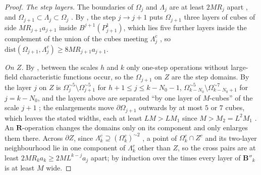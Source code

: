 \documentclass[11pt]{preprint}
\numberwithin{equation}{section}
\theoremstyle{definition}
\theoremstyle{remark}
\theoremstyle{plain}
\begin{document}
\begin{proof}
\emph{The step layers.} The boundaries of $\Omega_j$ and $\Lambda_j$ are at least $2MR_j$ apart \cite[p.~256, ll.~21--24]{BalabanCRE}, and $\Omega_{j+1} \subset \Lambda_j \subset \Omega_j$ \cite[(2.1)]{BalabanCRE}. By \cite[(3.5), p.~265]{BalabanCRE}, the step $j \to j + 1$ puts $\Omega_{j+1}$ three layers of cubes of side $MR_{j+1}a_{j+1}$ inside $B^{j+1}(P^1_{j+1})$, which lies five further layers inside the complement of the union of the cubes meeting $\Lambda_j^c$ \cite[p.~264, ll.~52--55; p.~265, ll.~16--22]{BalabanCRE}, so $\mathrm{dist}(\Omega_{j+1}, \Lambda_j^c) \geq 8MR_{j+1}a_{j+1}$.

\emph{On $Z$.} By \cite[(1.2), p.~178]{BalabanLFR1}, between the scales $h$ and $k$ only one-step operations without large-field characteristic functions occur, so the $\Omega_{j+1}$ on $Z$ are the step domains. By \cite[(1.10)--(1.12), p.~179]{BalabanLFR1} the layer $j$ on $Z$ is $\Omega_j^{\sim5} \setminus \Omega_{j+1}^{\sim5}$ for $h + 1 \leq j \leq k - N_0 - 1$, $\Omega^{\sim5}_{k-N_0} \setminus \Omega^{\sim7}_{k-N_0+1}$ for $j = k - N_0$, and the layers above are separated ``by one layer of $M$-cubes'' of the scale $j + 1$ \cite[p.~179, ll.~21--24]{BalabanLFR1}; the enlargements move $\partial\Omega_{j+1}$ outwards by at most $5$ or $7$ cubes, which leaves the stated widths, each at least $LM > LM_1$ since $M > M_2 = L^2M_1$ \cite[p.~245, ll.~35--38]{BalabanCRE}. An $\mathbf R$-operation changes the domains only on its component and only enlarges them there. Across $\partial Z$, since $\Lambda_k^c \supseteq (\Omega_k^c)^{\sim2}$ \cite[(3.20), p.~269]{BalabanCRE}, a point of $\Omega_k^c \cap Z^c$ and its two-layer neighbourhood lie in one component of $\Lambda_k^c$ other than $Z$, so the cross pairs are at least $2MR_ka_k \geq 2ML^{k-j}a_j$ apart; by induction over the times every layer of $\mathbf B''_k$ is at least $M$ wide.


\end{proof}
\end{document}
